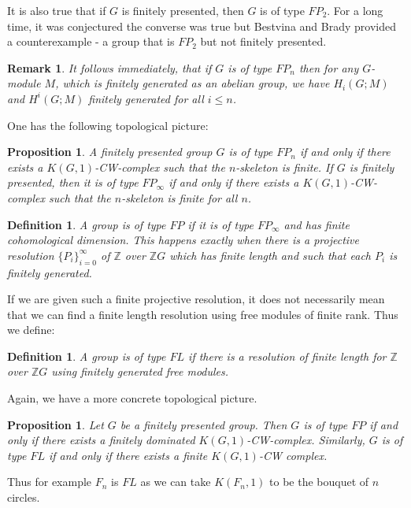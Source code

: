 \documentclass{amsart}
\newtheorem{prop}[thm]{Proposition}
\newtheorem{rem}[thm]{Remark}
\newtheorem{defn}[thm]{Definition}
\begin{document}
It is also true that if $G$ is finitely presented,
then $G$ is of type $FP_2$. For a long time, it was conjectured the converse
was true but Bestvina and Brady provided a counterexample - a group that
is $FP_2$ but not finitely presented.

\begin{rem}
It follows immediately, that if $G$ is of type $FP_n$ then for any
$G$-module $M$, which is finitely generated as an abelian group, we have
$H_i(G;M)$ and $H^i(G;M)$ finitely generated for all $i \leq n$.
\end{rem}

One has the following topological picture: 

\begin{prop}
A finitely presented group $G$ is of type $FP_n$ if and only if
there exists a $K(G,1)$-CW-complex such that the $n$-skeleton is finite. 
If $G$ is finitely presented, then it is of type $FP_\infty$ if and only if
there exists a $K(G,1)$-CW-complex such that the $n$-skeleton is finite
for all $n$.
\end{prop}

\begin{defn}
A group is of type $FP$ if it is of type $FP_\infty$ and has finite
cohomological dimension. This happens exactly when there is a projective
resolution $\{ P_i \}_{i=0}^\infty$ of $\mathbb{Z}$ over $\mathbb{Z}G$
which has finite length and such that each $P_i$ is finitely generated.
\end{defn}

If we are given such a finite projective resolution, it does not necessarily
mean that we can find a finite length resolution using free modules of finite
rank. Thus we define:

\begin{defn}
A group is of type $FL$ if there is a resolution of finite length for
$\mathbb{Z}$ over
$\mathbb{Z}G$ using finitely generated free modules.
\end{defn}

Again, we have a more concrete topological picture.

\begin{prop}
Let $G$ be a finitely presented group. Then $G$ is of type $FP$ if and only
if there exists a finitely dominated $K(G,1)$-CW-complex. Similarly,
$G$ is of type $FL$ if and only if there exists a finite $K(G,1)$-CW complex.
\end{prop} 

Thus for example $F_n$ is $FL$ as we can take $K(F_n,1)$
to be the bouquet of $n$ circles.
\end{document}
